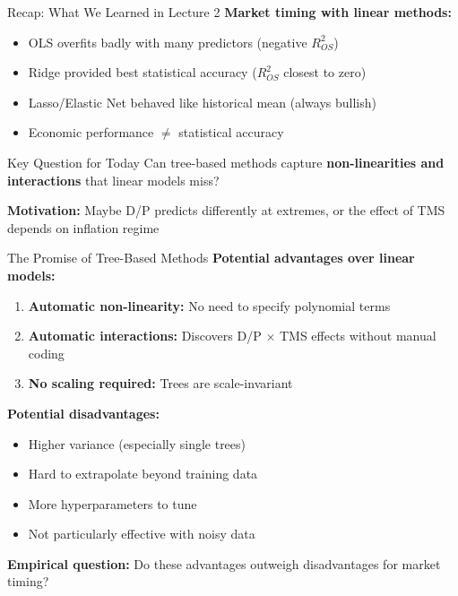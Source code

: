 \documentclass[10pt]{beamer}
\newcommand{\highlight}[1]{\textcolor{AccentOrange}{\textbf{#1}}}
\begin{document}
\begin{frame}{Recap: What We Learned in Lecture 2}
  \textbf{Market timing with linear methods:}

  \vspace{0.5em}
  \begin{itemize}
    \item OLS overfits badly with many predictors (negative $R^2_{OS}$)
    \item Ridge provided best statistical accuracy ($R^2_{OS}$ closest to zero)
    \item Lasso/Elastic Net behaved like historical mean (always bullish)
    \item Economic performance $\neq$ statistical accuracy
  \end{itemize}

  \vspace{1em}
  \begin{block}{Key Question for Today}
    Can tree-based methods capture \highlight{non-linearities and interactions} that linear models miss?
  \end{block}

  \vspace{0.5em}
  \textbf{Motivation:} Maybe D/P predicts differently at extremes, or the effect of TMS depends on inflation regime
\end{frame}


\begin{frame}{The Promise of Tree-Based Methods}
  \textbf{Potential advantages over linear models:}

  \vspace{0.5em}
  \begin{enumerate}
    \item \highlight{Automatic non-linearity:} No need to specify polynomial terms
    \vspace{0.3em}
    \item \highlight{Automatic interactions:} Discovers D/P $\times$ TMS effects without manual coding
    \vspace{0.3em}
    \item \highlight{No scaling required:} Trees are scale-invariant
  \end{enumerate}

  \vspace{1em}
  \textbf{Potential disadvantages:}
  \begin{itemize}
    \item Higher variance (especially single trees)
    \item Hard to extrapolate beyond training data
    \item More hyperparameters to tune
    \item Not particularly effective with noisy data
  \end{itemize}

  \vspace{0.5em}
  \textbf{Empirical question:} Do these advantages outweigh disadvantages for market timing?
\end{frame}
\end{document}
